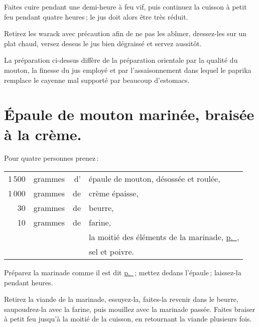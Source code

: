 Faites cuire pendant une demi-heure à feu vif, puis continuez la cuisson
à petit feu pendant quatre heures ; le jus doit alors être très réduit.

Retirez les warack avec précaution afin de ne pas les abîmer, dressez-les sur
un plat chaud, versez dessus le jus bien dégraissé et servez aussitôt.

La préparation ci-dessus diffère de la préparation orientale par la qualité du
mouton, la finesse du jus employé et par l'assaisonnement dans lequel le paprika
remplace le cayenne mal supporté par beaucoup d’estomacs.

\section*{\centering Épaule de mouton marinée, braisée à la crème.}
{}

Pour quatre personnes prenez :

\medskip

\footnotesize
\begin{longtable}{rrrp{16em}}
  1 500 & grammes & d' & épaule de mouton, désossée et roulée,                                            \\
  1 000 & grammes & de & crème épaisse,                                                                   \\
     30 & grammes & de & beurre,                                                                          \\
     10 & grammes & de & farine,                                                                          \\
        &         &    & la moitié des éléments de la marinade, \hyperlink{p0514}{p. \pageref{pg0514}},   \\
        &         &    & sel et poivre.                                                                   \\
\end{longtable}
\normalsize

Préparez la marinade comme il est dit \hyperlink{p0515}{p. \pageref{pg0515}} ;
mettez dedans l'épaule ; laissez-la pendant {\mmm} heures.

Retirez la viande de la marinade, essuyez-la, faites-la revenir dans le beurre,
saupoudrez-la avec la farine, puis mouillez avec la marinade passée. Faites braiser
à petit feu jusqu'à la moitié de la cuisson, en retournant la viande plusieurs fois.

